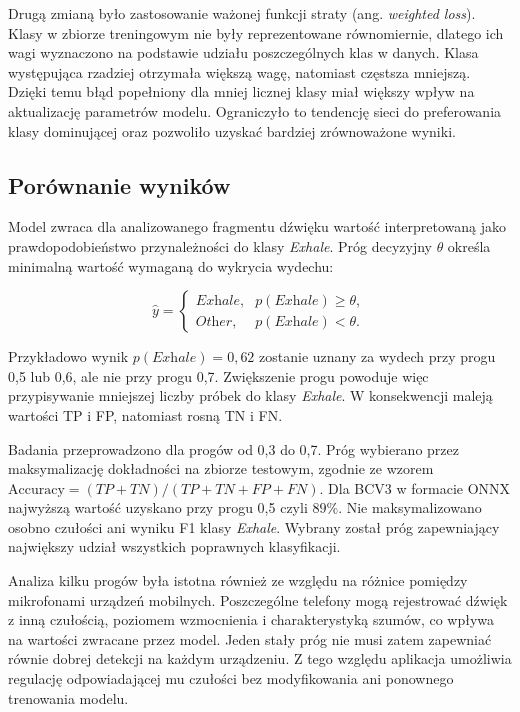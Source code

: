 Drugą zmianą było zastosowanie ważonej funkcji straty (ang. \textit{weighted loss}). Klasy w zbiorze treningowym nie były reprezentowane równomiernie, dlatego ich wagi wyznaczono na podstawie udziału poszczególnych klas w danych. Klasa występująca rzadziej otrzymała większą wagę, natomiast częstsza mniejszą. Dzięki temu błąd popełniony dla mniej licznej klasy miał większy wpływ na aktualizację parametrów modelu. Ograniczyło to tendencję sieci do preferowania klasy dominującej oraz pozwoliło uzyskać bardziej zrównoważone wyniki.

\subsection{Porównanie wyników}

Model zwraca dla analizowanego fragmentu dźwięku wartość interpretowaną jako prawdopodobieństwo przynależności do klasy \textit{Exhale}. Próg decyzyjny $\theta$ określa minimalną wartość wymaganą do wykrycia wydechu:

\begin{equation}
    \widehat{y} = \begin{cases}
        \textit{Exhale}, & p(\textit{Exhale}) \geq \theta, \\
        \textit{Other}, & p(\textit{Exhale}) < \theta.
    \end{cases}
\end{equation}

Przykładowo wynik $p(\textit{Exhale})=0{,}62$ zostanie uznany za wydech przy progu 0,5 lub 0,6, ale nie przy progu 0,7. Zwiększenie progu powoduje więc przypisywanie mniejszej liczby próbek do klasy \textit{Exhale}. W konsekwencji maleją wartości TP i FP, natomiast rosną TN i FN.

Badania przeprowadzono dla progów od 0,3 do 0,7. Próg wybierano przez maksymalizację dokładności na zbiorze testowym, zgodnie ze wzorem $\mathrm{Accuracy}=(TP+TN)/(TP+TN+FP+FN)$. Dla BCV3 w formacie ONNX najwyższą wartość uzyskano przy progu 0,5 czyli $89\%$. Nie maksymalizowano osobno czułości ani wyniku F1 klasy \textit{Exhale}. Wybrany został próg zapewniający największy udział wszystkich poprawnych klasyfikacji.

Analiza kilku progów była istotna również ze względu na różnice pomiędzy mikrofonami urządzeń mobilnych. Poszczególne telefony mogą rejestrować dźwięk z inną czułością, poziomem wzmocnienia i charakterystyką szumów, co wpływa na wartości zwracane przez model. Jeden stały próg nie musi zatem zapewniać równie dobrej detekcji na każdym urządzeniu. Z tego względu aplikacja umożliwia regulację odpowiadającej mu czułości bez modyfikowania ani ponownego trenowania modelu.

